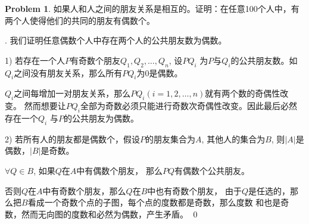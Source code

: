 \documentclass[UTF8]{ctexart}
\newenvironment{sol}
  {\par\vspace{3mm}\noindent{\it Solution}.}
  {\qed \\ \medskip}
\theoremstyle{definition}
\newtheorem{problem}{Problem}
\begin{document}
\begin{problem}
如果人和人之间的朋友关系是相互的。证明：在任意100个人中，有两个人使得他们的共同的朋友有偶数个。
\begin{sol}
    我们证明任意偶数个人中存在两个人的公共朋友数为偶数。

    1) 若存在一个人$P$有奇数个朋友$Q_1, Q_2, \dots, Q_n$, 设$PQ_i$
    为$P$与$Q_i$的公共朋友数。如$Q_i$之间没有朋友关系，那么所有$PQ_i$为$0$是偶数。

    
    $Q_i$之间每增加一对朋友关系，那么$PQ_i(i=1,2,\dots,n)$就有两个数的奇偶性改变。
    然而想要让$PQ_i$全部为奇数必须只能进行奇数次奇偶性改变。因此最后必然存在一个$Q_i$
    与$P$的公共朋友为偶数。

    2) 若所有人的朋友都是偶数个，假设$P$的朋友集合为$A$, 其他人的集合为$B$,
    则$|A|$是偶数，$|B|$是奇数。
    
    $\forall Q \in B$, 如果$Q$在$A$中有偶数个朋友，
    那么$PQ$有偶数个公共朋友。
    
    否则$Q$在$A$中有奇数个朋友，那么$Q$在$B$中也有奇数个朋友，
    由于$Q$是任选的，那么把$B$看成一个奇数个点的子图，每个点的度数都是奇数，那么度数
    和也是奇数，然而无向图的度数和必然为偶数，产生矛盾。
\end{sol}
\end{problem}
\end{document}

